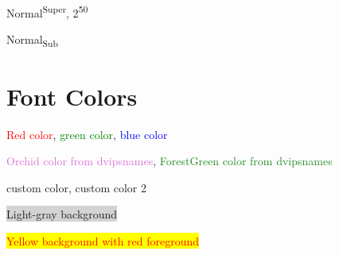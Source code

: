 \documentclass{article}
\begin{document}

Normal\textsuperscript{Super}, 2\textsuperscript{50}

Normal\textsubscript{Sub}



\section{Font Colors}


\textcolor{red}{Red color}, \textcolor{green}{green color}, \textcolor{blue}{blue color}

\textcolor{Orchid}{Orchid color from dvipsnames}, \textcolor{ForestGreen}{ForestGreen color from dvipsnames}

\textcolor{MyColor}{custom color}, \textcolor{MyColor2}{custom color 2}

\colorbox{lightgray}{Light-gray background}

\colorbox{yellow}{\textcolor{red}{Yellow background with red foreground}}
\end{document}
